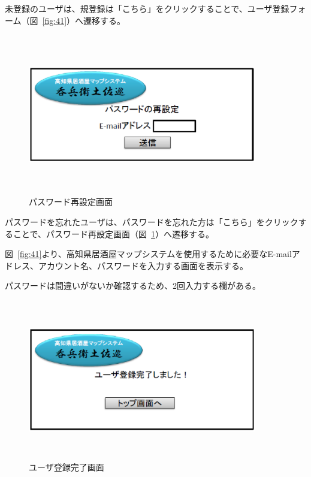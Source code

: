 \documentclass[a4j,titlepage]{jarticle}
\begin{document}
未登録のユーザは、規登録は「こちら」をクリックすることで、ユーザ登録フォーム（図~\ref{fig:41}）へ遷移する。

\clearpage

\begin {figure}[!htbp]
    \begin{center}
    \includegraphics [height=7cm, width=10cm]{42.eps}
    \caption {パスワード再設定画面}
    \label {fig:42}
    \end{center}
\end {figure}




パスワードを忘れたユーザは、パスワードを忘れた方は「こちら」をクリックすることで、パスワード再設定画面（図~\ref{fig:42}）へ遷移する。





図~\ref{fig:41}より、高知県居酒屋マップシステムを使用するために必要なE-mailアドレス、アカウント名、パスワードを入力する画面を表示する。



パスワードは間違いがないか確認するため、2回入力する欄がある。

\clearpage

\begin {figure}[!htbp]
    \begin{center}
    \includegraphics [height=7cm, width=10cm]{43.eps}
    \caption {ユーザ登録完了画面}
    \label {fig:43}
    \end{center}
\end {figure}
\end{document}
